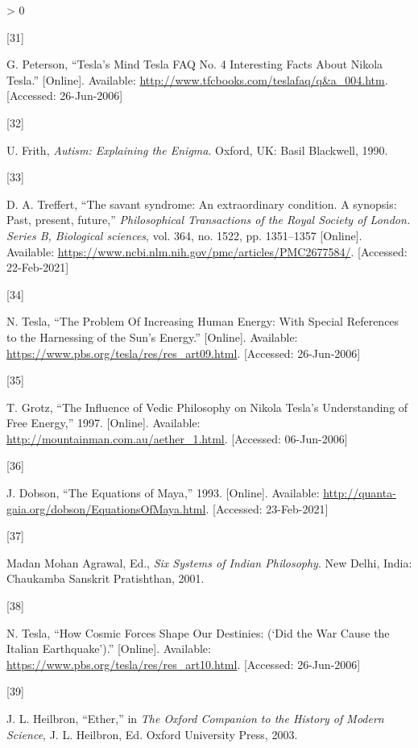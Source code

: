 \documentclass[
  11pt,
  a4paper,
]{article}
\newlength{\cslhangindent}
\newlength{\csllabelwidth}
\newenvironment{CSLReferences}[2] %
 {%
  \setlength{\parindent}{0pt}
  \ifodd #1 \everypar{\setlength{\hangindent}{\cslhangindent}}\ignorespaces\fi
  \ifnum #2 > 0
  \setlength{\parskip}{#2\baselineskip}
  \fi
 }%
 {}
\newcommand{\CSLLeftMargin}[1]{\parbox[t]{\csllabelwidth}{#1}}
\newcommand{\CSLRightInline}[1]{\parbox[t]{\linewidth - \csllabelwidth}{#1}\break}
\begin{document}
\begin{CSLReferences}{0}{0}
\leavevmode\hypertarget{ref-tesla-faq}{}%
\CSLLeftMargin{{[}31{]} }
\CSLRightInline{G. Peterson, {``{Tesla's Mind \textbar{} Tesla FAQ No. 4
\textbar{} Interesting Facts About Nikola Tesla}.''} {[}Online{]}.
Available: \url{http://www.tfcbooks.com/teslafaq/q\&a_004.htm}.
{[}Accessed: 26-Jun-2006{]}}

\leavevmode\hypertarget{ref-frith90}{}%
\CSLLeftMargin{{[}32{]} }
\CSLRightInline{U. Frith, \emph{{Autism: Explaining the Enigma}}.
Oxford, UK: Basil Blackwell, 1990. }

\leavevmode\hypertarget{ref-savant2009}{}%
\CSLLeftMargin{{[}33{]} }
\CSLRightInline{D. A. Treffert, {``The savant syndrome: An extraordinary
condition. A synopsis: Past, present, future,''} \emph{Philosophical
Transactions of the Royal Society of London. Series B, Biological
sciences}, vol. 364, no. 1522, pp. 1351--1357 {[}Online{]}. Available:
\url{https://www.ncbi.nlm.nih.gov/pmc/articles/PMC2677584/}.
{[}Accessed: 22-Feb-2021{]}}

\leavevmode\hypertarget{ref-tesla-energy}{}%
\CSLLeftMargin{{[}34{]} }
\CSLRightInline{N. Tesla, {``{The Problem Of Increasing Human Energy:
With Special References to the Harnessing of the Sun's Energy}.''}
{[}Online{]}. Available:
\url{https://www.pbs.org/tesla/res/res_art09.html}. {[}Accessed:
26-Jun-2006{]}}

\leavevmode\hypertarget{ref-grotz}{}%
\CSLLeftMargin{{[}35{]} }
\CSLRightInline{T. Grotz, {``{The Influence of Vedic Philosophy on
Nikola Tesla's Understanding of Free Energy},''} 1997. {[}Online{]}.
Available: \url{http://mountainman.com.au/aether_1.html}. {[}Accessed:
06-Jun-2006{]}}

\leavevmode\hypertarget{ref-dobson}{}%
\CSLLeftMargin{{[}36{]} }
\CSLRightInline{J. Dobson, {``{The Equations of Maya},''} 1993.
{[}Online{]}. Available:
\url{http://quanta-gaia.org/dobson/EquationsOfMaya.html}. {[}Accessed:
23-Feb-2021{]}}

\leavevmode\hypertarget{ref-agra01}{}%
\CSLLeftMargin{{[}37{]} }
\CSLRightInline{Madan Mohan Agrawal, Ed., \emph{{Six Systems of Indian
Philosophy}}. New Delhi, India: Chaukamba Sanskrit Pratishthan, 2001. }

\leavevmode\hypertarget{ref-tesla-cosmic}{}%
\CSLLeftMargin{{[}38{]} }
\CSLRightInline{N. Tesla, {``{How Cosmic Forces Shape Our Destinies:
({`Did the War Cause the Italian Earthquake'})}.''} {[}Online{]}.
Available: \url{https://www.pbs.org/tesla/res/res_art10.html}.
{[}Accessed: 26-Jun-2006{]}}

\leavevmode\hypertarget{ref-heil03}{}%
\CSLLeftMargin{{[}39{]} }
\CSLRightInline{J. L. Heilbron, {``Ether,''} in \emph{{The Oxford
Companion to the History of Modern Science}}, J. L. Heilbron, Ed. Oxford
University Press, 2003. }

\end{CSLReferences}
\end{document}

